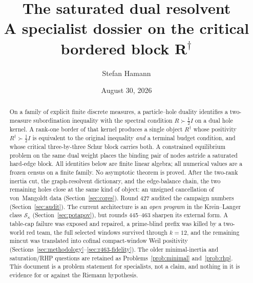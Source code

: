 \documentclass[11pt]{article}
\title{\bfseries The saturated dual resolvent\\[2mm]
\large A specialist dossier on the critical bordered block
$\boldsymbol{R^{\dagger}}$}
\author{Stefan Hamann}
\date{August 30, 2026}
\theoremstyle{remark}
\newcommand{\Rd}{R^{\dagger}}
\newcommand{\half}{\tfrac12}
\newcommand{\Sk}{\mathcal{S}}
\begin{document}
\maketitle

\begin{abstract}\noindent
On a family of explicit finite discrete measures, a particle--hole
duality identifies a two-measure subordination inequality with the
spectral condition $R\succ\half I$ on a dual hole kernel.  A rank-one
border of that kernel produces a single object $\Rd$ whose positivity
$\Rd\succ\half I$ is equivalent to the original inequality
\emph{and} a terminal budget condition, and whose critical
three-by-three Schur block carries both.  A constrained equilibrium
problem on the same dual weight places the binding pair of nodes
astride a saturated hard-edge block.  All identities below are finite
linear algebra; all numerical values are a frozen census on a finite
family.  No asymptotic theorem is proved.  After the two-rank inertia
cut, the graph-resolvent dictionary, and the edge-balance chain,
the two remaining holes close at the same kind of object: an
unsigned cancellation of von~Mangoldt data
(Section~\ref{sec:cores}).  Round 427 audited the campaign
numbers (Section~\ref{sec:audit}).  The current architecture is
an \emph{open program} in the Krein--Langer class $\Sk_{\kappa}$
(Section~\ref{sec:potapov}), but rounds 445--463 sharpen its
external form.  A table-cap failure was exposed and repaired, a
prime-blind prefix was killed by a two-world red team, the full
selected windows survived through $k=12$, and the remaining
mincut was translated into cofinal compact-window Weil positivity
(Sections~\ref{sec:methodology}--\ref{sec:r463-fidelity}).  The
older minimal-inertia and
saturation/RHP questions are retained as
Problems~\ref{prob:minimal} and~\ref{prob:rhp}.  This document is
a problem statement for specialists, not a claim, and nothing in
it is evidence for or against the Riemann hypothesis.
\end{abstract}
\end{document}
